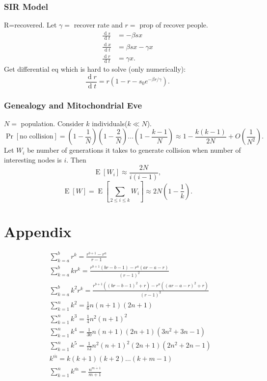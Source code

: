 \documentclass[a4paper,twocolumn,10pt]{article}
\newcommand{\pte}[1]{\left({#1}\right)}
\newcommand{\op}{\operatorname}
\newcommand{\E}{\operatorname{E}}
\newcommand{\dd}{\op{d}}
\begin{document}
	\subsubsection{SIR Model}
		R=recovered. Let $\gamma=$ recover rate and $r=$ prop of recover people.
		\[ \begin{split}
			\frac{\dd s}{\dd t} &= -\beta s x \\
			\frac{\dd x}{\dd t} &= \beta s x - \gamma x \\
			\frac{\dd r}{\dd t} &= \gamma x.
		\end{split} \]
		Get differential eq which is hard to solve (only numerically):
		\[
			\frac{\dd r}{\dd t} =
				r\pte{1-r-s_0 e^{-\beta r/\gamma}}.
		\]

	\subsubsection{Genealogy and Mitochondrial Eve}
		$N=$ population. Consider $k$ individuals($k\ll N$).
		\[
		\Pr[\textrm{no collision}] = \pte{1-\frac{1}{N}} \pte{1-\frac{2}{N}}
		... \pte{1-\frac{k-1}{N}} \approx 1 - \frac{k(k-1)}{2N} + O\pte{\frac{1}{N^2}}.
		\]
		Let $W_i$ be number of generations it takes to generate collision when
			number of interesting nodes is $i$.
		Then
		\[
			\E[W_i]\approx \frac{2N}{i(i-1)},
		\]
		\[
			\E[W]=\E\left[\sum_{2\le i\le k} W_i\right]\approx 2N\pte{1-\frac{1}{k}}.
		\]
		
\section{Appendix}
\begin{align*}
        &\sum_{k=a}^br^k=\frac{r^{b+1}-r^a}{r-1}\\
        &\sum_{k=a}^bkr^k=\frac{r^{b+1}(br-b-1)-r^a(ar-a-r)}{(r-1)^2}\\
        &\sum_{k=a}^bk^2r^k=\frac{r^{b+1}((br-b-1)^2+r)-r^a((ar-a-r)^2+r)}{(r-1)^3}\\
        &\sum_{k=1}^nk^2=\frac{1}{6}n(n+1)(2n+1)\\
        &\sum_{k=1}^nk^3=\frac{1}{4}n^2(n+1)^2\\
        &\sum_{k=1}^nk^4=\frac{1}{30}n(n+1)(2n+1)(3n^2+3n-1)\\
        &\sum_{k=1}^nk^5=\frac{1}{12}n^2(n+1)^2(2n+1)(2n^2+2n-1)\\
        &k^{\overline{m}}=k(k+1)(k+2)\dots(k+m-1)\\
        &\sum_{k=1}^nk^{\overline{m}}=\frac{n^{\overline{m+1}}}{m+1}\\
\end{align*}
\end{document}
